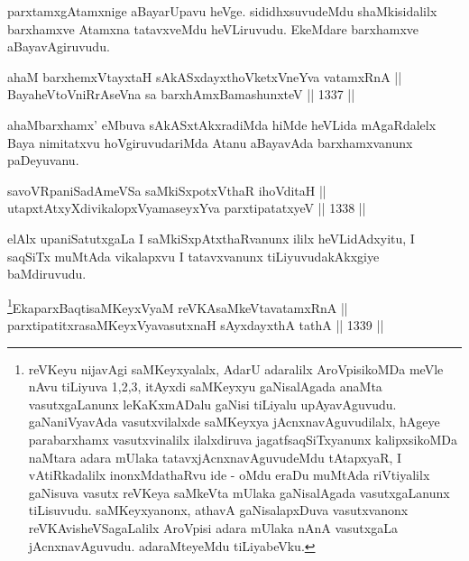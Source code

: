 \begin{artha}
parxtamxgAtamxnige aBayarUpavu heVge. sididhxsuvudeMdu shaMkisidalilx barxhamxve Atamxna tatavxveMdu heVLiruvudu. EkeMdare barxhamxve aBayavAgiruvudu.
\end{artha}

\begin{shl}
ahaM barxhemxVtayxtaH sAkASxdayxthoVketxVneYva vatamxRnA  || \\
BayaheVtoVniRrAseVna sa barxhAmxBamashunxteV \hfill || 1337 ||  
\end{shl}

\begin{artha}
ahaMbarxhamx' eMbuva sAkASxtAkxradiMda hiMde heVLida mAgaRdalelx Baya nimitatxvu hoVgiruvudariMda Atanu aBayavAda barxhamxvanunx paDeyuvanu.
\end{artha}


\begin{shl}
savoVRpaniSadAmeVSa saMkiSxpotxV\s thaR ihoVditaH || \\
utapxtAtxyXdivikalopxV\s yamaseyxYva parxtipatatxyeV \hfill || 1338 ||  
\end{shl}

\begin{artha}
elAlx upaniSatutxgaLa I saMkiSxpAtxthaRvanunx ililx heVLidAdxyitu, I saqSiTx muMtAda vikalapxvu I tatavxvanunx tiLiyuvudakAkxgiye baMdiruvudu.
\end{artha}



\begin{shl}
\footnote{reVKeyu nijavAgi saMKeyxyalalx, AdarU adaralilx AroVpisikoMDa meVle nAvu tiLiyuva 1,2,3, itAyxdi saMKeyxyu gaNisalAgada anaMta vasutxgaLanunx leKaKxmADalu gaNisi tiLiyalu upAyavAguvudu. gaNaniVyavAda vasutxvilalxde saMKeyxya jAcnxnavAguvudilalx, hAgeye parabarxhamx vasutxvinalilx ilalxdiruva jagatfsaqSiTxyanunx kalipxsikoMDa naMtara adara mUlaka tatavxjAcnxnavAguvudeMdu tAtapxyaR, I vAtiRkadalilx inonxMdathaRvu ide - oMdu eraDu muMtAda riVtiyalilx gaNisuva vasutx reVKeya saMkeVta mUlaka gaNisalAgada vasutxgaLanunx tiLisuvudu. saMKeyxyanonx, athavA gaNisalapxDuva vasutxvanonx reVKAvisheVSagaLalilx AroVpisi adara mUlaka nAnA vasutxgaLa jAcnxnavAguvudu. adaraMteyeMdu tiLiyabeVku.}EkaparxBaqtisaMKeyxVyaM reVKAsaMkeVtavatamxRnA || \\
parxtipatitxrasaMKeyxVyavasutxnaH sAyxdayxthA tathA \hfill || 1339 ||  
\end{shl}
				
